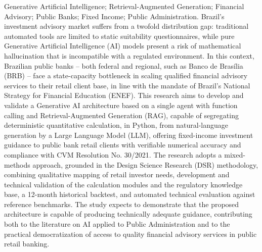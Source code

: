 \documentclass[dissertacao]{idpthesis}
\begin{document}
\begin{resumoingles}{Generative Artificial Intelligence; Retrieval-Augmented Generation; Financial Advisory; Public Banks; Fixed Income; Public Administration.}
  Brazil's investment advisory market suffers from a twofold distribution
  gap: traditional automated tools are limited to static suitability
  questionnaires, while pure Generative Artificial Intelligence (AI) models
  present a risk of mathematical hallucination that is incompatible with a
  regulated environment. In this context, Brazilian public banks -- both
  federal and regional, such as Banco de Bras\'ilia (BRB) -- face a
  state-capacity bottleneck in scaling
  qualified financial advisory services to their retail client base, in
  line with the mandate of Brazil's National Strategy for Financial
  Education (ENEF). This research aims to develop and validate a
  Generative AI architecture based on a single agent with function calling
  and Retrieval-Augmented Generation (RAG), capable of segregating
  deterministic quantitative calculation, in Python, from natural-language
  generation by a Large Language Model (LLM), offering fixed-income
  investment guidance to public bank retail clients with verifiable numerical
  accuracy and compliance with CVM Resolution No. 30/2021. The research
  adopts a mixed-methods approach, grounded in the Design Science Research
  (DSR) methodology, combining qualitative mapping of retail investor
  needs, development and technical validation of the calculation modules
  and the regulatory knowledge base, a 12-month historical backtest, and
  automated technical evaluation against reference benchmarks. The
  study expects to demonstrate that the proposed architecture is capable
  of producing technically adequate guidance, contributing both to the
  literature on AI applied to Public Administration and to the practical
  democratization of access to quality financial advisory services in
  public retail banking.
\end{resumoingles}

\listadeilustracoes
\listofquadros

\sumario

\idpiniciotextual
\end{document}
